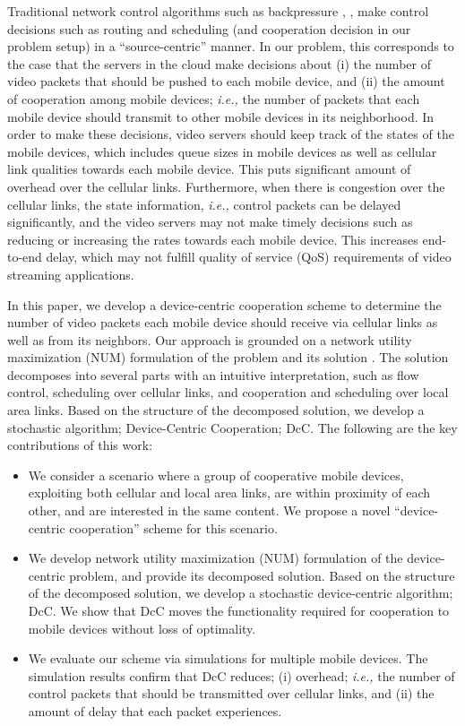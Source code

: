 \documentclass[conference]{IEEEtran}
\newcommand{\ie}{{\em i.e., }}
\begin{document}
Traditional network control algorithms such as backpressure \cite{tass1}, \cite{tass2}, \cite{neelymoli} make control decisions such as routing and scheduling (and cooperation decision in our problem setup) in a ``source-centric'' manner. In our problem, this corresponds to the case that the servers in the cloud make decisions about (i) the number of video packets that should be pushed to each mobile device, and (ii) the amount of cooperation among mobile devices; \ie the number of packets that each mobile device should transmit to other mobile devices in its neighborhood. In order to make these decisions, video servers should keep track of the states of the mobile devices, which includes queue sizes in mobile devices as well as cellular link qualities towards each mobile device. This puts significant amount of overhead over the cellular links. Furthermore, when there is congestion over the cellular links, the state information, \ie control packets can be delayed significantly, and the video servers may not make timely decisions such as reducing or increasing the rates towards each mobile device. This increases end-to-end delay, which may not fulfill quality of service (QoS) requirements of video streaming applications.


In this paper, we develop a device-centric cooperation scheme to determine the number of video packets each mobile device should receive via cellular links as well as from its neighbors.
Our approach is grounded on a network utility maximization (NUM) formulation of the problem and its solution \cite{tutorial_doyle}. The solution decomposes into several parts with an intuitive interpretation, such as flow control, scheduling over cellular links, and cooperation and scheduling over local area links. Based on the structure of the decomposed solution, we develop a stochastic algorithm; Device-Centric Cooperation; DcC.
The following are the key contributions of this work:
\begin{itemize}
  \item We consider a scenario where a group of cooperative mobile devices, exploiting both cellular and local area links, are within proximity of each other, and are interested in the same content. We propose a novel ``device-centric cooperation'' scheme for this scenario.
  \item We develop network utility maximization (NUM) formulation of the device-centric problem, and provide its decomposed solution. Based on the structure of the decomposed solution, we develop a stochastic device-centric algorithm; DcC. We show that DcC moves the functionality required for cooperation to mobile devices without loss of optimality.
  \item We evaluate our scheme via simulations for multiple mobile devices. The simulation results confirm that DcC reduces; (i) overhead; \ie the number of control packets that should be transmitted over cellular links, and (ii) the amount of delay that each packet experiences.
\end{itemize}
\end{document}
